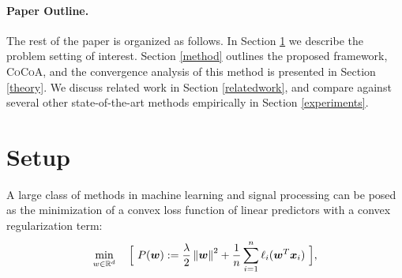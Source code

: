 \documentclass{article} %
\newcommand{\algname}{\textsc{CoCoA}\xspace}  %
\begin{document}
%
%
%
%
%
%
\paragraph{Paper Outline.} 
The rest of the paper is organized as follows. In Section \ref{setup} we
describe the problem setting of interest. Section \ref{method} outlines the
proposed framework, \algname, and the convergence analysis of this method is
presented in Section \ref{theory}. We discuss related work in Section
\ref{relatedwork}, and compare against several other state-of-the-art methods empirically
in Section \ref{experiments}. 



%
\section{Setup} \label{setup}
A large class of methods in machine learning and signal processing can be posed as the minimization of a convex loss function of linear predictors with a convex regularization term:
%
\begin{equation}
\label{eq:sdcaPrimal}
\min_{w \in\R^d} \quad \Big[\ P(\wv) := \frac{\lambda}{2}\norm{\wv}^2 +\frac1n 
                       \sum_{i=1}^n \ell_i( \wv^T \x_i ) \ \Big], 
\end{equation}
\end{document}
